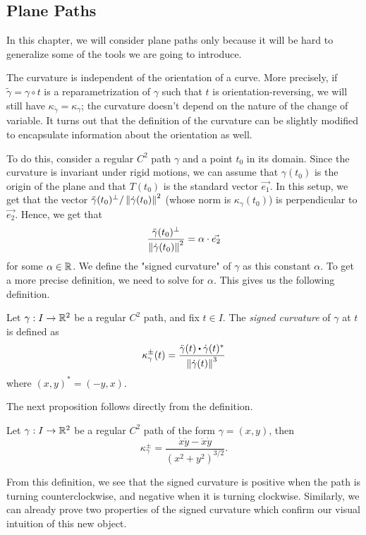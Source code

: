 \subsection{Plane Paths}

In this chapter, we will consider plane paths only because it will be hard to generalize some of the tools we are going to introduce.

The curvature is independent of the orientation of a curve. More precisely, if $\tilde{\gamma} = \gamma \circ t$ is a reparametrization of $\gamma$ such that $t$ is orientation-reversing, we will still have $\kappa_{\tilde{\gamma}} = \kappa_{\gamma}$; the curvature doesn't depend on the nature of the change of variable. It turns out that the definition of the curvature can be slightly modified to encapsulate information about the orientation as well.

To do this, consider a regular $C^2$ path $\gamma$ and a point $t_0$ in its domain. Since the curvature is invariant under rigid motions, we can assume that $\gamma(t_0)$ is the origin of the plane and that $T(t_0)$ is the standard vector $\vec{e_1}$. In this setup, we get that the vector $\ddot{\gamma}(t_0)^{\perp}/\left\lVert\dot{\gamma}(t_0) \right\rVert^2$ (whose norm is $\kappa_{\gamma}(t_0)$) is perpendicular to $\vec{e_2}$. Hence, we get that 
$$\frac{\ddot{\gamma}(t_0)^{\perp}}{\left\lVert\dot{\gamma}(t_0) \right\rVert^2} = \alpha \cdot \vec{e_2}$$
for some $\alpha \in \mathbb{R}$. We define the "signed curvature" of $\gamma$ as this constant $\alpha$. To get a more precise definition, we need to solve for $\alpha$. This gives us the following definition.

\begin{definition}
    Let $\gamma : I \to \mathbb{R}^2$ be a regular $C^2$ path, and fix $t \in I$. The \textit{signed curvature} of $\gamma$ at $t$ is defined as
    $$\kappa_\gamma^{\pm}(t) = \frac{\ddot{\gamma}(t) \bigcdot \dot{\gamma}(t)^*}{\norm{\dot{\gamma}(t)}^3}$$
    where $(x,y)^* = (-y, x)$.
\end{definition}

The next proposition follows directly from the definition.

\begin{proposition}
    Let $\gamma : I \to \mathbb{R}^2$ be a regular $C^2$ path of the form $\gamma = (x,y)$, then 
    $$\kappa_{\gamma}^{\pm} = \frac{\dot{x}\ddot{y} - \ddot{x}\dot{y}}{(x^2 + y^2)^{3/2}}.$$
\end{proposition}

From this definition, we see that the signed curvature is positive when the path is turning counterclockwise, and negative when it is turning clockwise. Similarly, we can already prove two properties of the signed curvature which confirm our visual intuition of this new object.

